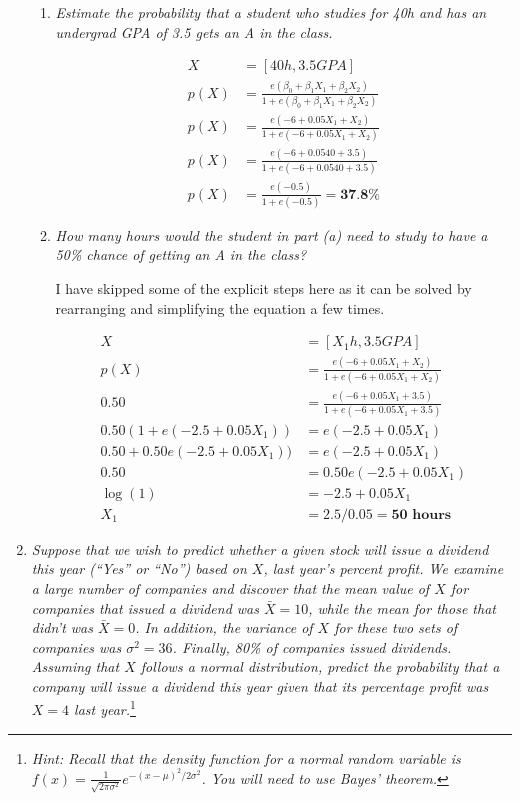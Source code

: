 \documentclass[11pt]{article}
\begin{document}
\begin{enumerate}
    \begin{enumerate}
        \item \textit{Estimate the probability that a student who studies for 40h and has an undergrad GPA of 3.5 gets an A in the class.}

\begin{align*}
        X &= [40 h, 3.5 GPA] \\
     p(X) &= \frac {e(\beta_0 + \beta_1 X_1 + \beta_2 X_2)}
                 {1 + e(\beta_0 + \beta_1 X_1 + \beta_2 X_2)} \\
     p(X) &= \frac {e(-6 + 0.05 X_1 + X_2)} {1 + e(-6 + 0.05 X_1 + X_2)} \\
     p(X) &= \frac {e(-6 + 0.05 40 + 3.5)} {1 + e(-6 + 0.05 40 + 3.5)}\\
     p(X) &= \frac {e(-0.5)} {1 + e(-0.5)} = \textbf{37.8}\% 
\end{align*}

        \item \textit{How many hours would the student in part (a) need to study to have a 50\% chance of getting an A in the class?}

I have skipped some of the explicit steps here as it can be solved by rearranging and simplifying the equation a few times.

\begin{align*}
    X &= [X_1 h, 3.5 GPA] \\
    p(X) &= \frac {e(-6 + 0.05 X_1 + X_2)} {1 + e(-6 + 0.05 X_1 + X_2)} \\
    0.50 &= \frac {e(-6 + 0.05 X_1 + 3.5)} {1 + e(-6 + 0.05 X_1 + 3.5)} \\
    0.50 (1 + e(-2.5 + 0.05 X_1)) &= e(-2.5 + 0.05 X_1) \\
    0.50 + 0.50 e(-2.5 + 0.05 X_1)) &= e(-2.5 + 0.05 X_1) \\
    0.50 &= 0.50 e(-2.5 + 0.05 X_1) \\
    \log(1) &= -2.5 + 0.05 X_1 \\
    X_1 &= 2.5 / 0.05 = \textbf{50 hours}
\end{align*}


    \end{enumerate}


    \item \textit{Suppose that we wish to predict whether a given stock will issue a dividend this year (“Yes” or “No”) based on $X$, last year’s percent profit. We examine a large number of companies and discover that the mean value of $X$ for companies that issued a dividend was $\bar{X} = 10$, while the mean for those that didn’t was $\bar{X} = 0$. In addition, the variance of $X$ for these two sets of companies was $\sigma^2 = 36$. Finally, 80\% of companies issued dividends. Assuming that $X$ follows a normal distribution, predict the probability that a company will issue a dividend this year given that its percentage profit was $X = 4$ last year.}\footnote{\textit{Hint: Recall that the density function for a normal random variable is $f(x) = \frac{1}{\sqrt{2\pi\sigma^2}}e^{-(x-\mu)^2/2\sigma^2}$. You will need to use Bayes' theorem.}}


\end{enumerate}
\end{document}
